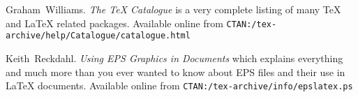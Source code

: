 \begin{thebibliography}{99}
 Graham~Williams.  \newblock \emph{The TeX
    Catalogue} is a very complete listing of many \TeX{} and \LaTeX{}
    related packages.
  \newblock Available online from \texttt{CTAN:/tex-archive/help/Catalogue/catalogue.html}
  
 Keith~Reckdahl.  \newblock \emph{Using EPS Graphics in
    \LaTeXe{} Documents} which explains everything and much more than
  you ever wanted to know about EPS files and their use in \LaTeX{}
  documents.  \newblock Available online from
  \texttt{CTAN:/tex-archive/info/epslatex.ps}

\end{thebibliography}


